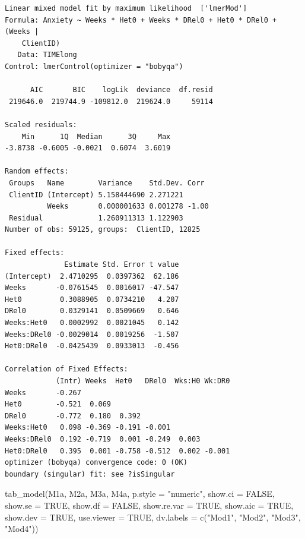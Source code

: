 \documentclass[
  english,
]{book}
\newenvironment{Shaded}{\begin{snugshade}}{\end{snugshade}}
\newcommand{\AttributeTok}[1]{\textcolor[rgb]{0.77,0.63,0.00}{#1}}
\newcommand{\ConstantTok}[1]{\textcolor[rgb]{0.00,0.00,0.00}{#1}}
\newcommand{\FunctionTok}[1]{\textcolor[rgb]{0.00,0.00,0.00}{#1}}
\newcommand{\NormalTok}[1]{#1}
\newcommand{\StringTok}[1]{\textcolor[rgb]{0.31,0.60,0.02}{#1}}
\begin{document}
\begin{verbatim}
Linear mixed model fit by maximum likelihood  ['lmerMod']
Formula: Anxiety ~ Weeks * Het0 + Weeks * DRel0 + Het0 * DRel0 + (Weeks |  
    ClientID)
   Data: TIMElong
Control: lmerControl(optimizer = "bobyqa")

      AIC       BIC    logLik  deviance  df.resid 
 219646.0  219744.9 -109812.0  219624.0     59114 

Scaled residuals: 
    Min      1Q  Median      3Q     Max 
-3.8738 -0.6005 -0.0021  0.6074  3.6019 

Random effects:
 Groups   Name        Variance    Std.Dev. Corr 
 ClientID (Intercept) 5.158444690 2.271221      
          Weeks       0.000001633 0.001278 -1.00
 Residual             1.260911313 1.122903      
Number of obs: 59125, groups:  ClientID, 12825

Fixed effects:
              Estimate Std. Error t value
(Intercept)  2.4710295  0.0397362  62.186
Weeks       -0.0761545  0.0016017 -47.547
Het0         0.3088905  0.0734210   4.207
DRel0        0.0329141  0.0509669   0.646
Weeks:Het0   0.0002992  0.0021045   0.142
Weeks:DRel0 -0.0029014  0.0019256  -1.507
Het0:DRel0  -0.0425439  0.0933013  -0.456

Correlation of Fixed Effects:
            (Intr) Weeks  Het0   DRel0  Wks:H0 Wk:DR0
Weeks       -0.267                                   
Het0        -0.521  0.069                            
DRel0       -0.772  0.180  0.392                     
Weeks:Het0   0.098 -0.369 -0.191 -0.001              
Weeks:DRel0  0.192 -0.719  0.001 -0.249  0.003       
Het0:DRel0   0.395  0.001 -0.758 -0.512  0.002 -0.001
optimizer (bobyqa) convergence code: 0 (OK)
boundary (singular) fit: see ?isSingular
\end{verbatim}

\begin{Shaded}
\begin{Highlighting}[]
\FunctionTok{tab\_model}\NormalTok{(M1a, M2a, M3a, M4a, }\AttributeTok{p.style =} \StringTok{"numeric"}\NormalTok{, }\AttributeTok{show.ci =} \ConstantTok{FALSE}\NormalTok{, }\AttributeTok{show.se =} \ConstantTok{TRUE}\NormalTok{, }\AttributeTok{show.df =} \ConstantTok{FALSE}\NormalTok{, }\AttributeTok{show.re.var =} \ConstantTok{TRUE}\NormalTok{, }\AttributeTok{show.aic =} \ConstantTok{TRUE}\NormalTok{, }\AttributeTok{show.dev =} \ConstantTok{TRUE}\NormalTok{, }\AttributeTok{use.viewer =} \ConstantTok{TRUE}\NormalTok{, }\AttributeTok{dv.labels =} \FunctionTok{c}\NormalTok{(}\StringTok{"Mod1"}\NormalTok{, }\StringTok{"Mod2"}\NormalTok{, }\StringTok{"Mod3"}\NormalTok{, }\StringTok{"Mod4"}\NormalTok{))}
\end{Highlighting}
\end{Shaded}
\end{document}
